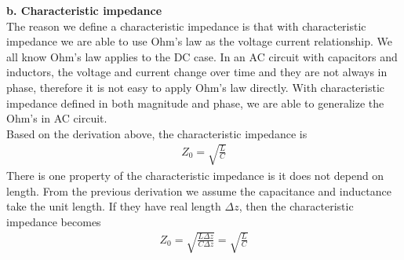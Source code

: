 \documentclass[a4paper]{article}
\begin{document}
{\bf b. Characteristic impedance}\\
The reason we define a characteristic impedance is that with characteristic impedance we are able to use Ohm's law as the voltage current relationship. We all know Ohm's law applies to the DC case. In an AC circuit with capacitors and inductors, the voltage and current change over time and they are not always in phase, therefore it is not easy to apply Ohm's law directly. With characteristic impedance defined in both magnitude and phase, we are able to generalize the Ohm's in AC circuit.\\
Based on the derivation above, the characteristic impedance is 
\begin{align*}
	Z_0 = \sqrt{\frac{L}{C}}
\end{align*}
There is one property of the characteristic impedance is it does not depend on length. From the previous derivation we assume the capacitance and inductance take the unit length. If they have real length  $\Delta z$, then the characteristic impedance becomes
\begin{align*}
	Z_0 = \sqrt{\frac{L \Delta z}{C \Delta z}} = \sqrt{\frac{L}{C}}
\end{align*}
\end{document}
